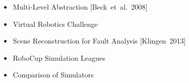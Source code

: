 \documentclass[]{beamer}
\begin{document}
\begin{frame}
\begin{columns}
\begin{overlayarea}{\textwidth}{0.8\textheight}
    ~
    \\
    ~
    ~
    \end{overlayarea}
    \begin{overlayarea}{\textwidth}{0.6\textheight}
      \begin{itemize}
      \item Multi-Level Abstraction [Beck~et~al.~2008]
        \pause
      \item Virtual Robotics Challenge
        \pause
      \item Scene Reconstruction for Fault Analysis [Klingen~2013]
        \pause
      \item RoboCup Simulation Leagues
        \pause
      \item Comparison of Simulators
      \end{itemize}
    \end{overlayarea}
  \end{columns}
\end{frame}
\end{document}
